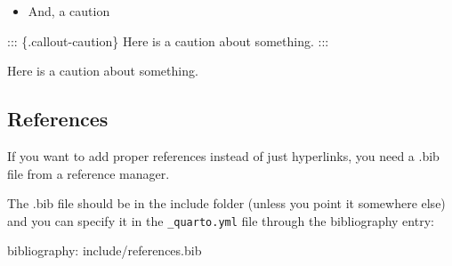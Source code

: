 \documentclass[
  letterpaper,
  DIV=11,
  numbers=noendperiod]{scrreprt}
\newenvironment{Shaded}{\begin{snugshade}}{\end{snugshade}}
\newcommand{\NormalTok}[1]{\textcolor[rgb]{0.00,0.23,0.31}{#1}}
\newcommand{\SpecialCharTok}[1]{\textcolor[rgb]{0.37,0.37,0.37}{#1}}
\providecommand{\tightlist}{%
  \setlength{\itemsep}{0pt}\setlength{\parskip}{0pt}}\usepackage{longtable,booktabs,array}
\begin{document}
\begin{itemize}
\tightlist
\item
  And, a caution
\end{itemize}

\begin{Shaded}
\begin{Highlighting}[]
\SpecialCharTok{:::}\NormalTok{ \{.callout}\SpecialCharTok{{-}}\NormalTok{caution\}}
\NormalTok{Here is a caution about something.}
\SpecialCharTok{:::}
\end{Highlighting}
\end{Shaded}

\begin{tcolorbox}[enhanced jigsaw, colbacktitle=quarto-callout-caution-color!10!white, titlerule=0mm, leftrule=.75mm, title=\textcolor{quarto-callout-caution-color}{\faFire}\hspace{0.5em}{Caution}, breakable, bottomrule=.15mm, opacitybacktitle=0.6, rightrule=.15mm, opacityback=0, arc=.35mm, colframe=quarto-callout-caution-color-frame, toptitle=1mm, bottomtitle=1mm, toprule=.15mm, left=2mm, colback=white, coltitle=black]

Here is a caution about something.

\end{tcolorbox}

\subsection{References}\label{references}

If you want to add proper references instead of just hyperlinks, you
need a .bib file from a reference manager.

The .bib file should be in the include folder (unless you point it
somewhere else) and you can specify it in the \texttt{\_quarto.yml} file
through the bibliography entry:

\begin{Shaded}
\begin{Highlighting}[]
\NormalTok{bibliography}\SpecialCharTok{:}\NormalTok{ include}\SpecialCharTok{/}\NormalTok{references.bib}
\end{Highlighting}
\end{Shaded}
\end{document}
